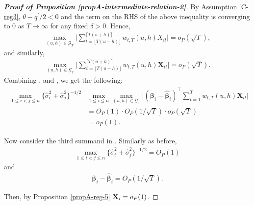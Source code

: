 \documentclass[a4paper,12pt]{article}
\makeatletter
\renewcommand{\eqref}[1]{\tagform@{\ref{#1}}}
\makeatother
\begin{document}
\begin{proof}[\textnormal{\textbf{Proof of Proposition \ref{propA-intermediate-relation-2}}}]
By Assumption \ref{C-reg3}, $\theta - q^\prime/2 <0$ and the term on the RHS of the above inequality is converging to $0$ as $T \to \infty$ for any fixed $\delta >0$. Hence, 
\begin{align*}
\max_{(u, h) \in \mathcal{G}_T} \bigg| \sum_{t=\lfloor T(u-h) \rfloor}^{\lceil T(u+h) \rceil} w_{t,T}(u,h)X_{it}  \bigg| = o_P(\sqrt{T}),
\end{align*}
and similarly,
\begin{align}\label{ineq-diff-9}
\max_{(u, h) \in \mathcal{G}_T} \bigg| \sum_{t=\lfloor T(u-h) \rfloor}^{\lceil T(u+h) \rceil} w_{t,T}(u,h)\mathbf{X}_{it}  \bigg| = o_P(\sqrt{T}).
\end{align}
Combining \eqref{ineq-diff-6}, \eqref{ineq-diff-7} and \eqref{ineq-diff-9}, we get the following:
\begin{align}\label{ineq-diff-10}
\begin{split}
\max_{1\le i < j \le n} \{\widehat{\sigma}_i^2+ \widehat{\sigma}_j^2 \}^{-1/2}&\max_{1\le i \le n} \max_{(u,h) \in \mathcal{G}_T} \Big| (\bm{\beta}_i - \widehat{\bm{\beta}}_i)^\top\sum_{t=1}^T w_{t,T}(u,h) \mathbf{X}_{it} \Big|  \\
&=O_P(1) \cdot O_P(1/\sqrt{T}) \cdot o_P(\sqrt{T}) \\
&= o_P(1).
\end{split}
\end{align}


Now consider the third summand in \eqref{ineq-diff-1}. Similarly as before, 
\begin{align}\label{ineq-diff-11}
\max_{1\le i < j \le n}\{\widehat{\sigma}_i^2+ \widehat{\sigma}_j^2 \}^{-1/2}  = O_P(1)
\end{align}
and
\begin{align}\label{ineq-diff-12}
\bm{\beta}_i - \widehat{\bm{\beta}}_i = O_P(1/\sqrt{T}).
\end{align}

Then, by Proposition \ref{propA-reg-5} $\bar{\mathbf{X}}_i = o_P(1)$.


\end{proof}
\end{document}
